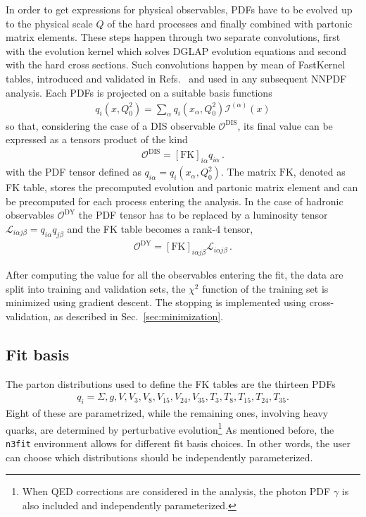%
In order to get expressions for physical observables, PDFs have to be
evolved up to the physical scale $Q$ of the hard processes and finally 
combined with partonic matrix elements. These steps happen through two separate convolutions, first with
the evolution kernel which solves DGLAP evolution equations and second with the hard cross sections.
Such convolutions happen by mean of FastKernel tables, introduced and validated in Refs.~\cite{Ball:2010de,Bertone:2016lga}
and used in any subsequent NNPDF analysis.
Each PDFs is projected on a suitable basis functions
\begin{align}
    \label{eq:pdf_interpolation_basis}
    q_i\left(x,Q_0^2\right) = \sum_{\alpha}q_i\left(x_{\alpha},Q_0^2\right)\mathcal{I}^{(\alpha)}\left(x\right) 
\end{align}
so that, considering the case of a DIS observable $\mathcal{O}^{\text{DIS}}$, its final value 
can be expressed as a tensors product of the kind  
\begin{align}
    \label{eq:DIS_obs}
    \mathcal{O}^{\text{DIS}} = \left[\text{FK}\right]_{i\alpha}q_{i\alpha}\,.
\end{align}
with the PDF tensor defined as $q_{i\alpha} = q_i\left(x_{\alpha},Q_0^2\right)$.
The matrix $\text{FK}$, denoted as FK table, stores the precomputed evolution and partonic matrix element 
and can be precomputed for each process entering the analysis.
In the case of hadronic observables $\mathcal{O}^{\text{DY}}$ 
the PDF tensor has to be replaced by a luminosity tensor $\mathcal{L}_{i\alpha j\beta} = q_{i\alpha}q_{j\beta}$ 
and the FK table becomes a rank-4 tensor,
\begin{align}
    \label{eq:DY_obs}
    \mathcal{O}^{\text{DY}} = \left[\text{FK}\right]_{i\alpha j\beta}\mathcal{L}_{i\alpha j\beta}\,.
\end{align}

%
After computing the value for all the observables entering the fit, the data are split into training and 
validation sets, the $\chi^2$ function of the training set is minimized using gradient descent.
The stopping is implemented using cross-validation, as described in Sec.~\ref{sec:minimization}.

%

\subsection{Fit basis}
\label{sec:fitbasis}
The parton distributions used to define the FK tables are the thirteen PDFs
\begin{align}
	\label{eq::fkdistributions}
	q_i = \Sigma, g, V, V_3, V_8, V_{15}, V_{24}, V_{35}, T_3, T_8, T_{15}, T_{24}, T_{35}.
\end{align}
Eight of these are parametrized, while the remaining ones, involving heavy quarks,
are determined by perturbative evolution\footnote{When QED corrections are considered in the analysis,
the photon PDF $\gamma$ is also included and independently parameterized.}     
As mentioned before, the {\tt n3fit} environment allows for different fit basis choices. In other 
words, the user can choose which distributions should be independently parameterized. 

